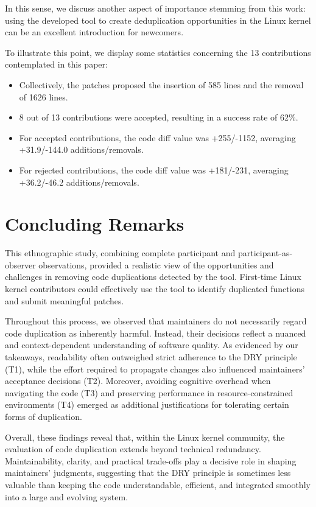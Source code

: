 \documentclass[10pt,conference]{IEEEtran}
\begin{document}
In this sense, we discuss another aspect of importance stemming from this work: using the developed tool to create deduplication opportunities in the Linux kernel can be an excellent introduction for newcomers.

To illustrate this point, we display some statistics concerning the 13 contributions contemplated in this paper:

\begin{itemize}
  \item Collectively, the patches proposed the insertion of 585 lines and the removal of 1626 lines.
  \item 8 out of 13 contributions were accepted, resulting in a success rate of 62\%.
  \item For accepted contributions, the code diff value was +255/-1152, averaging +31.9/-144.0 additions/removals.
  \item For rejected contributions, the code diff value was +181/-231, averaging +36.2/-46.2 additions/removals.
\end{itemize}


\section{Concluding Remarks}

This ethnographic study, combining complete participant and participant-as-observer observations, provided a realistic view of the opportunities and challenges in removing code duplications detected by the tool. First-time Linux kernel contributors could effectively use the tool to identify duplicated functions and submit meaningful patches.

Throughout this process, we observed that maintainers do not necessarily regard code duplication as inherently harmful. Instead, their decisions reflect a nuanced and context-dependent understanding of software quality. As evidenced by our takeaways, readability often outweighed strict adherence to the DRY principle (T1), while the effort required to propagate changes also influenced maintainers’ acceptance decisions (T2). Moreover, avoiding cognitive overhead when navigating the code (T3) and preserving performance in resource-constrained environments (T4) emerged as additional justifications for tolerating certain forms of duplication.

Overall, these findings reveal that, within the Linux kernel community, the evaluation of code duplication extends beyond technical redundancy. Maintainability, clarity, and practical trade-offs play a decisive role in shaping maintainers’ judgments, suggesting that the DRY principle is sometimes less valuable than keeping the code understandable, efficient, and integrated smoothly into a large and evolving system.
\end{document}
